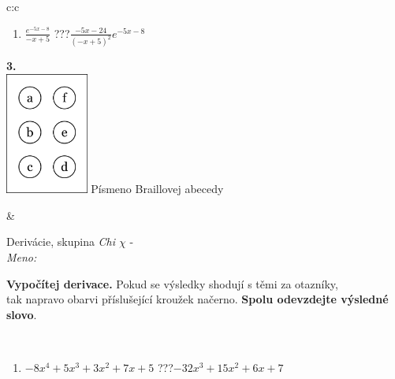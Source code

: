 \documentclass[10pt]{report}
\begin{document}
\begin{tabular}{c:c}
\begin{minipage}[c][104.5mm][t]{0.5\linewidth}
\begin{center}
\begin{minipage}{0.79\linewidth}
\begin{center}
\begin{varwidth}{\linewidth}
\begin{enumerate}
\item $\frac{e^{-5x-8}}{-x+5}$\quad \dotfill\; ???\;\dotfill \quad $\frac{-5x-24}{(-x+5)^2}e^{-5x-8}$
\end{enumerate}
\end{varwidth}
\end{center}
\end{minipage}
\begin{minipage}{0.20\linewidth}
\begin{center}
{\Huge\bfseries 3.} \\[2mm]
\includegraphics[height=40mm]{../images/braille.png}
{\small Písmeno Braillovej abecedy}
\end{center}
\end{minipage}
\end{center}
\end{minipage}
&
\begin{minipage}[c][104.5mm][t]{0.5\linewidth}
\begin{center}
\vspace{7mm}
{\huge Derivácie, skupina \textit{Chi $\chi$} -}\\[5mm]
\textit{Meno:}\phantom{xxxxxxxxxxxxxxxxxxxxxxxxxxxxxxxxxxxxxxxxxxxxxxxxxxxxxxxxxxxxxxxxx}\\[5mm]
\begin{minipage}{0.95\linewidth}
\begin{center}
\textbf{Vypočítej derivace.} Pokud se výsledky shodují s těmi za otazníky,\\tak napravo obarvi příslušející kroužek načerno. \textbf{Spolu odevzdejte výsledné slovo}.
\end{center}
\end{minipage}
\\[1mm]
\begin{minipage}{0.79\linewidth}
\begin{center}
\begin{varwidth}{\linewidth}
\begin{enumerate}
\normalsize
\item $-8x^4+5x^3+3x^2+7x+5$\quad \dotfill\; ???\;\dotfill \quad $-32x^3+15x^2+6x+7$

\end{enumerate}
\end{varwidth}
\end{center}
\end{minipage}
\end{center}
\end{minipage}
\end{tabular}
\end{document}
